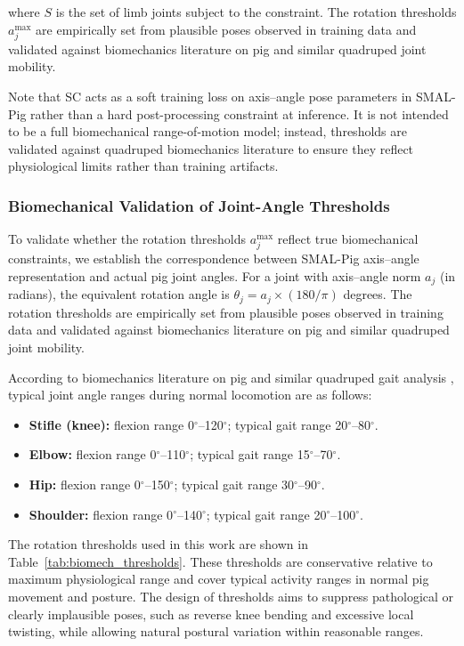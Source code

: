 \documentclass[computers,article,submit,pdftex,moreauthors]{Definitions/mdpi}
\begin{document}
where $S$ is the set of limb joints subject to the constraint. The rotation thresholds $a_j^{\max}$ are empirically set from plausible poses observed in training data and validated against biomechanics literature on pig and similar quadruped joint mobility.

Note that SC acts as a soft training loss on axis--angle pose parameters in SMAL-Pig rather than a hard post-processing constraint at inference. It is not intended to be a full biomechanical range-of-motion model; instead, thresholds are validated against quadruped biomechanics literature to ensure they reflect physiological limits rather than training artifacts.

\subsubsection{Biomechanical Validation of Joint-Angle Thresholds}\label{sec:biomech_validation}

To validate whether the rotation thresholds $a_j^{\max}$ reflect true biomechanical constraints, we establish the correspondence between SMAL-Pig axis--angle representation and actual pig joint angles. For a joint with axis--angle norm $a_j$ (in radians), the equivalent rotation angle is $\theta_j = a_j \times (180/\pi)$ degrees. The rotation thresholds are empirically set from plausible poses observed in training data and validated against biomechanics literature on pig and similar quadruped joint mobility.

According to biomechanics literature on pig and similar quadruped gait analysis \cite{ref29,ref30,ref31}, typical joint angle ranges during normal locomotion are as follows:

\begin{itemize}
  \item \textbf{Stifle (knee):} flexion range 0$^\circ$--120$^\circ$; typical gait range 20$^\circ$--80$^\circ$.
  \item \textbf{Elbow:} flexion range 0$^\circ$--110$^\circ$; typical gait range 15$^\circ$--70$^\circ$.
  \item \textbf{Hip:} flexion range 0$^\circ$--150$^\circ$; typical gait range 30$^\circ$--90$^\circ$.
  \item \textbf{Shoulder:} flexion range 0$^\circ$--140$^\circ$; typical gait range 20$^\circ$--100$^\circ$.
\end{itemize}

The rotation thresholds used in this work are shown in Table~\ref{tab:biomech_thresholds}. These thresholds are conservative relative to maximum physiological range and cover typical activity ranges in normal pig movement and posture. The design of thresholds aims to suppress pathological or clearly implausible poses, such as reverse knee bending and excessive local twisting, while allowing natural postural variation within reasonable ranges.
\end{document}
